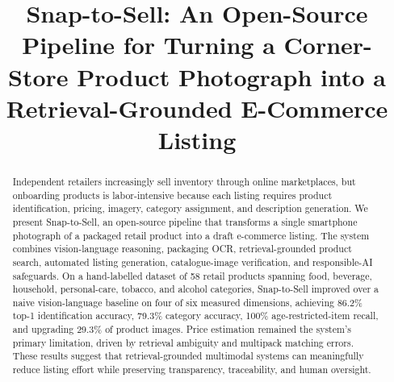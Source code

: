 \documentclass[conference]{IEEEtran}
\begin{document}
\title{Snap-to-Sell: An Open-Source Pipeline for Turning a Corner-Store
Product Photograph into a Retrieval-Grounded E-Commerce Listing}

\author{%
\and
{}
\and
{}
\and
{}
}

\maketitle

\begin{abstract}
Independent retailers increasingly sell inventory through online marketplaces,
but onboarding products is labor-intensive because each listing requires
product identification, pricing, imagery, category assignment, and description
generation. We present Snap-to-Sell, an open-source pipeline that transforms a
single smartphone photograph of a packaged retail product into a draft
e-commerce listing. The system combines vision-language reasoning, packaging
OCR, retrieval-grounded product search, automated listing generation,
catalogue-image verification, and responsible-AI safeguards. On a hand-labelled
dataset of 58 retail products spanning food, beverage, household,
personal-care, tobacco, and alcohol categories, Snap-to-Sell improved over a
naive vision-language baseline on four of six measured dimensions, achieving
86.2\% top-1 identification accuracy, 79.3\% category accuracy, 100\%
age-restricted-item recall, and upgrading 29.3\% of product images. Price
estimation remained the system's primary limitation, driven by retrieval
ambiguity and multipack matching errors. These results suggest that
retrieval-grounded multimodal systems can meaningfully reduce listing effort
while preserving transparency, traceability, and human oversight.
\end{abstract}
\end{document}
